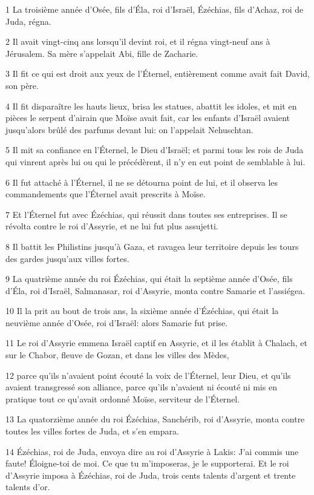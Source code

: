 \par 1 La troisième année d'Osée, fils d'Éla, roi d'Israël, Ézéchias, fils d'Achaz, roi de Juda, régna.
\par 2 Il avait vingt-cinq ans lorsqu'il devint roi, et il régna vingt-neuf ans à Jérusalem. Sa mère s'appelait Abi, fille de Zacharie.
\par 3 Il fit ce qui est droit aux yeux de l'Éternel, entièrement comme avait fait David, son père.
\par 4 Il fit disparaître les hauts lieux, brisa les statues, abattit les idoles, et mit en pièces le serpent d'airain que Moïse avait fait, car les enfants d'Israël avaient jusqu'alors brûlé des parfums devant lui: on l'appelait Nehuschtan.
\par 5 Il mit sa confiance en l'Éternel, le Dieu d'Israël; et parmi tous les rois de Juda qui vinrent après lui ou qui le précédèrent, il n'y en eut point de semblable à lui.
\par 6 Il fut attaché à l'Éternel, il ne se détourna point de lui, et il observa les commandements que l'Éternel avait prescrits à Moïse.
\par 7 Et l'Éternel fut avec Ézéchias, qui réussit dans toutes ses entreprises. Il se révolta contre le roi d'Assyrie, et ne lui fut plus assujetti.
\par 8 Il battit les Philistins jusqu'à Gaza, et ravagea leur territoire depuis les tours des gardes jusqu'aux villes fortes.
\par 9 La quatrième année du roi Ézéchias, qui était la septième année d'Osée, fils d'Éla, roi d'Israël, Salmanasar, roi d'Assyrie, monta contre Samarie et l'assiégea.
\par 10 Il la prit au bout de trois ans, la sixième année d'Ézéchias, qui était la neuvième année d'Osée, roi d'Israël: alors Samarie fut prise.
\par 11 Le roi d'Assyrie emmena Israël captif en Assyrie, et il les établit à Chalach, et sur le Chabor, fleuve de Gozan, et dans les villes des Mèdes,
\par 12 parce qu'ils n'avaient point écouté la voix de l'Éternel, leur Dieu, et qu'ils avaient transgressé son alliance, parce qu'ils n'avaient ni écouté ni mis en pratique tout ce qu'avait ordonné Moïse, serviteur de l'Éternel.
\par 13 La quatorzième année du roi Ézéchias, Sanchérib, roi d'Assyrie, monta contre toutes les villes fortes de Juda, et s'en empara.
\par 14 Ézéchias, roi de Juda, envoya dire au roi d'Assyrie à Lakis: J'ai commis une faute! Éloigne-toi de moi. Ce que tu m'imposeras, je le supporterai. Et le roi d'Assyrie imposa à Ézéchias, roi de Juda, trois cents talents d'argent et trente talents d'or.
